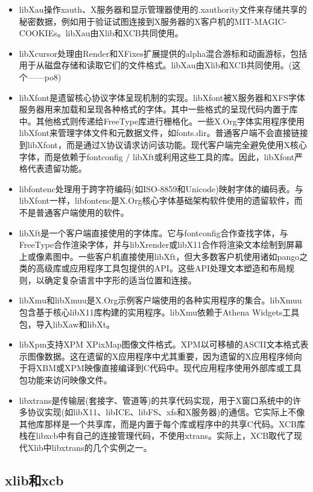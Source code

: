 \begin{itemize}

\item libXau操作xauth、X服务器和显示管理器使用的.xauthority文件来存储共享的秘密数据，例如用于验证试图连接到X服务器的X客户机的MIT-MAGIC-COOKIEs。libXau由Xlib和XCB共同使用。
\item libXcursor处理由Render和XFixes扩展提供的alpha混合游标和动画游标，包括用于从磁盘存储和读取它们的文件格式。libXau由Xlib和XCB共同使用。(这个——po8)
\item libXfont是遗留核心协议字体呈现机制的实现。libXfont被X服务器和XFS字体服务器用来加载和呈现各种格式的字体。其中一些格式的呈现代码内置于库中。其他格式则传递给FreeType库进行栅格化。一些X.Org字体实用程序使用libXfont来管理字体文件和元数据文件，如fonts.dir。普通客户端不会直接链接到libXfont，而是通过X协议请求访问该功能。现代客户端完全避免使用X核心字体，而是依赖于fontconfig / libXft或利用这些工具的库。因此，libXfont严格代表遗留功能。
\item libfontenc处理用于跨字符编码(如ISO-8859和Unicode)映射字体的编码表。与libXfont一样，libfontenc是X.Org核心字体基础架构软件使用的遗留软件，而不是普通客户端使用的软件。
\item libXft是一个客户端直接使用的字体库。它与fontconfig合作查找字体，与FreeType合作渲染字体，并与libXrender或libX11合作将渲染文本绘制到屏幕上或像素图中。一些客户机直接使用libXft，但大多数客户机使用诸如pango之类的高级库或应用程序工具包提供的API。这些API处理文本塑造和布局规则，以确定复杂语言中字形的适当位置和连接。
\item libXmu和libXmuu是X.Org示例客户端使用的各种实用程序的集合。libXmuu包含基于核心libX11库构建的实用程序。libXmu依赖于Athena Widgets工具包，导入libXaw和libXt。
\item libXpm支持XPM XPixMap图像文件格式。XPM以可移植的ASCII文本格式表示图像数据。这在遗留的X应用程序中尤其重要，因为遗留的X应用程序倾向于将XBM或XPM映像直接编译到C代码中。现代应用程序使用外部库或工具包功能来访问映像文件。
\item libxtrans是传输层(套接字、管道等)的共享代码实现，用于X窗口系统中的许多协议实现(如libX11、libICE、libFS、xfs和X服务器)的通信。它实际上不像其他库那样是一个共享库，而是内置于每个库或程序中的共享C代码。XCB库栈在libxcb中有自己的连接管理代码，不使用xtrans。实际上，XCB取代了现代Xlib中libxtrans的几个实例之一。
\end{itemize}

\subsection{xlib和xcb}

